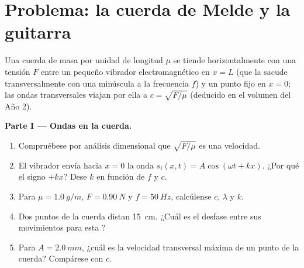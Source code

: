 \section{Problema: la cuerda de Melde y la guitarra}

\begin{problem}
\label{pb:b1:wave-propagation:1}
Una cuerda de masa por unidad de longitud $\mu$ se tiende horizontalmente
con una tensión $F$ entre un pequeño vibrador electromagnético en $x = L$
(que la sacude transversalmente con una  minúscula a la frecuencia
$f$) y un punto fijo en $x = 0$; las ondas transversales viajan por ella a
$c = \sqrt{F/\mu}$ (deducido en el volumen del Año 2).

\medskip
\noindent\textbf{Parte I --- Ondas en la cuerda.}
\begin{enumerate}
  \item Compruébese por análisis dimensional que $\sqrt{F/\mu}$ es una
        velocidad.
  \item El vibrador envía hacia $x = 0$ la onda
        $s_i(x, t) = A\cos(\omega t + kx)$. ¿Por qué el signo $+kx$? Dese
        $k$ en función de $f$ y $c$.
  \item Para $\mu = \qty{1.0}{g/m}$, $F = \qty{0.90}{N}$ y
        $f = \qty{50}{Hz}$, calcúlense $c$, $\lambda$ y $k$.
  \item Dos puntos de la cuerda distan \qty{15}{cm}. ¿Cuál es el desfase
        entre sus movimientos para esta ?
  \item Para $A = \qty{2.0}{mm}$, ¿cuál es la velocidad transversal máxima
        de un punto de la cuerda? Compárese con $c$.
\end{enumerate}


\end{problem}
